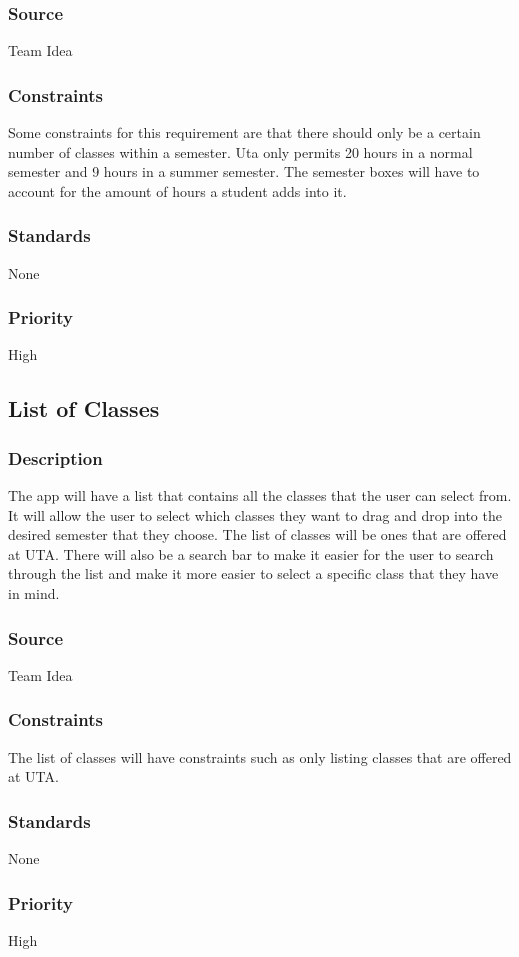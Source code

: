 \subsubsection{Source}
Team Idea
\subsubsection{Constraints}
Some constraints for this requirement are that there should only be a certain number of classes within a semester. Uta only permits 20 hours in a normal semester and 9 hours in a summer semester. The semester boxes will have to account for the amount of hours a student adds into it.  
\subsubsection{Standards}
None
\subsubsection{Priority}
High

\subsection{List of Classes}
\subsubsection{Description}
The app will have a list that contains all the classes that the user can select from. It will allow the user to select which classes they want to drag and drop into the desired semester that they choose. The list of classes will be ones that are offered at UTA. There will also be a search bar to make it easier for the user to search through the list and make it more easier to select a specific class that they have in mind. 
\subsubsection{Source}
Team Idea
\subsubsection{Constraints}
The list of classes will have constraints such as only listing classes that are offered at UTA. 
\subsubsection{Standards}
None
\subsubsection{Priority}
High

